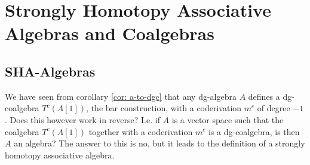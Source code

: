 \documentclass[../thesis.tex]{subfiles}
\begin{document}
            



    \section{Strongly Homotopy Associative Algebras and Coalgebras}
    \subsection{SHA-Algebras}
        We have seen from corollary \ref{cor: a-to-dgc} that any dg-algebra $A$ defines a dg-coalgebra $T^c(A[1])$, the bar construction, with a coderivation $m^c$ of degree $-1$. Does this however work in reverse? I.e. if $A$ is a vector space such that the coalgebra $T^c(A[1])$ together with a coderivation $m^c$ is a dg-coalgebra, is then $A$ an algebra? The answer to this is no, but it leads to the definition of a strongly homotopy associative algebra.
\end{document}
